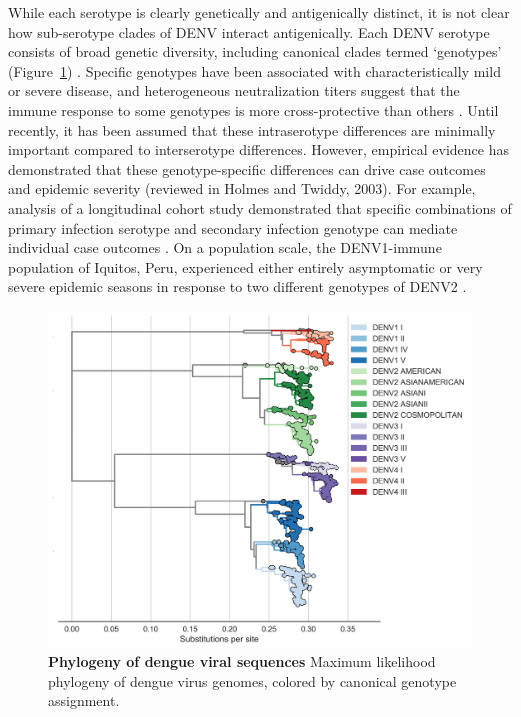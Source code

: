 While each serotype is clearly genetically and antigenically distinct, it is not clear how sub-serotype clades of DENV interact antigenically.
Each DENV serotype consists of broad genetic diversity, including canonical clades termed `genotypes' (Figure~\ref{genotype_tree}) \citep{rico1990molecular,twiddy2003inferring}.
Specific genotypes have been associated with characteristically mild or severe disease, and heterogeneous neutralization titers suggest that the immune response to some genotypes is more cross-protective than others \citep{gentry1982identification,russell1967dengue}.
Until recently, it has been assumed that these intraserotype differences are minimally important compared to interserotype differences.
However, empirical evidence has demonstrated that these genotype-specific differences can drive case outcomes and epidemic severity (reviewed in Holmes and Twiddy, 2003).
For example, analysis of a longitudinal cohort study demonstrated that specific combinations of primary infection serotype and secondary infection genotype can mediate individual case outcomes \citep{ohainle2011dynamics}.
On a population scale, the DENV1-immune population of Iquitos, Peru, experienced either entirely asymptomatic or very severe epidemic seasons in response to two different genotypes of DENV2 \citep{kochel2002effect}.

\begin{figure}[ht!]
  \begin{centering}
    \includegraphics[width=\linewidth]{./png/genotype_tree.png}
  	\caption[Phylogeny of dengue viral sequences]{\textbf{Phylogeny of dengue viral sequences }
    Maximum likelihood phylogeny of dengue virus genomes, colored by canonical genotype assignment.
    }
  	\label{genotype_tree}
  \end{centering}
\end{figure}

